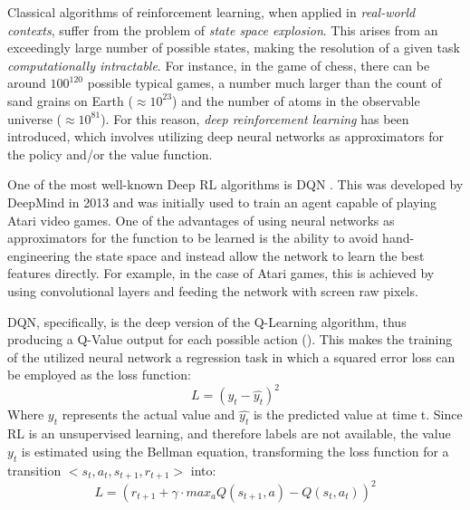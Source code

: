 \documentclass[12pt,a4paper,openright,twoside]{book}
\begin{document}
Classical algorithms of reinforcement learning, when applied in \emph{real-world contexts}, suffer from the problem of \emph{state space explosion}.
    This arises from an exceedingly large number of possible states, making the resolution of a given task \emph{computationally intractable}. 
    For instance, in the game of chess, there can be around $100^{120}$ possible typical games, a number much larger than 
    the count of sand grains on Earth ($\approx 10^{23}$) and the number of atoms in the observable universe 
    ($\approx 10^{81}$). 
    For this reason, \emph{deep reinforcement learning} has been introduced, which involves utilizing deep neural networks
    as approximators for the policy and/or the value function.

One of the most well-known Deep RL algorithms is DQN \cite{dqn}. This was developed by DeepMind in 2013 and was initially
    used to train an agent capable of playing Atari video games. One of the advantages of using neural networks as 
    approximators for the function to be learned is the ability to avoid hand-engineering the state space and instead 
    allow the network to learn the best features directly. For example, in the case of Atari games, this is achieved 
    by using convolutional layers and feeding the network with screen raw pixels.
    
DQN, specifically, is the deep version of the Q-Learning algorithm, thus producing a Q-Value output for each 
    possible action (). This makes the training of the utilized neural network a regression task 
    in which a squared error loss can be employed as the loss function:
    $$ L = (y_t - \hat{y_t})^2 $$
    Where $y_t$ represents the actual value and $\hat{y_t}$ is the predicted value at time t. Since RL is an 
    unsupervised learning, and therefore labels are not available, the value $y_t$ is estimated using the 
    Bellman equation, transforming the loss function for a transition $<s_t, a_t, s_{t+1}, r_{t+1}>$ into:
    $$ L = ( r_{t+1} + \gamma \cdot max_a Q(s_{t+1}, a) - Q(s_t, a_t))^2 $$
\end{document}
